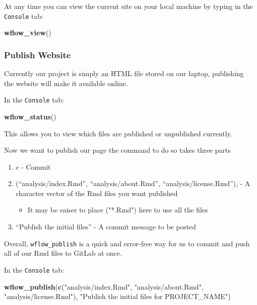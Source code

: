 \documentclass[]{book}
\newenvironment{Shaded}{\begin{snugshade}}{\end{snugshade}}
\newcommand{\KeywordTok}[1]{\textcolor[rgb]{0.13,0.29,0.53}{\textbf{#1}}}
\newcommand{\NormalTok}[1]{#1}
\newcommand{\StringTok}[1]{\textcolor[rgb]{0.31,0.60,0.02}{#1}}
\providecommand{\tightlist}{%
  \setlength{\itemsep}{0pt}\setlength{\parskip}{0pt}}
\begin{document}
At any time you can view the current site on your local machine by typing in the \texttt{Console} tab:

\begin{Shaded}
\begin{Highlighting}[]
\KeywordTok{wflow_view}\NormalTok{()}
\end{Highlighting}
\end{Shaded}

\hypertarget{publish-website}{%
\subsubsection{Publish Website}\label{publish-website}}

Currently our project is simply an HTML file stored on our laptop, publishing the website will make it available online.

In the \texttt{Console} tab:

\begin{Shaded}
\begin{Highlighting}[]
\KeywordTok{wflow_status}\NormalTok{()}
\end{Highlighting}
\end{Shaded}

This allows you to view which files are published or unpublished currently.

Now we want to publish our page the command to do so takes three parts

\begin{enumerate}
\def\labelenumi{\arabic{enumi}.}
\tightlist
\item
  c - Commit
\item
  (``analysis/index.Rmd'', ``analysis/about.Rmd'', ``analysis/license.Rmd''), - A character vector of the Rmd files you want published

  \begin{itemize}
  \tightlist
  \item
    It may be eaiser to place ("*.Rmd") here to use all the files
  \end{itemize}
\item
  ``Publish the initial files'' - A commit message to be posted
\end{enumerate}

Overall, \texttt{wflow\_publish} is a quick and error-free way for us to commit and push all of our Rmd files to GitLab at once.

In the \texttt{Console} tab:

\begin{Shaded}
\begin{Highlighting}[]
\KeywordTok{wflow_publish}\NormalTok{(}\KeywordTok{c}\NormalTok{(}\StringTok{"analysis/index.Rmd"}\NormalTok{, }\StringTok{"analysis/about.Rmd"}\NormalTok{, }\StringTok{"analysis/license.Rmd"}\NormalTok{), }\StringTok{"Publish the initial files for PROJECT_NAME"}\NormalTok{)}
\end{Highlighting}
\end{Shaded}
\end{document}
